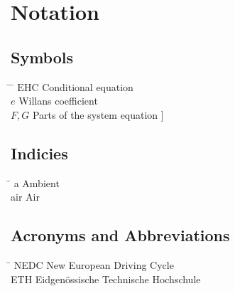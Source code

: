 \chapter*{Notation}\label{chap:symbole}

\section*{Symbols}
\begin{tabbing}
 \hspace*{1.6cm} \= \hspace*{8cm} \= \kill
 $\mathrm{EHC}$ \> Conditional equation \> [$-$] \\[0.5ex]
 $e$ \> Willans coefficient \> [$-$] \\[0.5ex]
 $F,G$ \> Parts of the system equation \> [\unitfrac[]{K}{s}]
\end{tabbing}

\section*{Indicies}
\begin{tabbing}
 \hspace*{1.6cm}  \= \kill
 a \> Ambient \\[0.5ex]
 air \> Air
\end{tabbing}

\section*{Acronyms and Abbreviations}
\begin{tabbing}
 \hspace*{1.6cm}  \= \kill
 NEDC \> New European Driving Cycle \\[0.5ex]
 ETH \> Eidgen\"{o}ssische Technische Hochschule
\end{tabbing}

 \cleardoublepage

